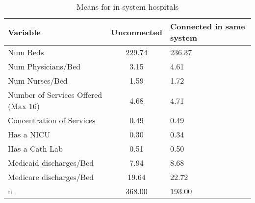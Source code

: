 \begin{table}[ht!]
\centering
\caption{Means for in-system hospitals}
\centering
\begin{tabular}[t]{lcl}
\toprule
Variable & Unconnected & Connected in same system\\
\midrule
Num Beds & 229.74 & 236.37\\
Num Physicians/Bed & 3.15 & 4.61\\
Num Nurses/Bed & 1.59 & 1.72\\
Number of Services Offered (Max 16) & 4.68 & 4.71\\
Concentration of Services & 0.49 & 0.49\\
\addlinespace
Has a NICU & 0.30 & 0.34\\
Has a Cath Lab & 0.51 & 0.50\\
Medicaid discharges/Bed & 7.94 & 8.68\\
Medicare discharges/Bed & 19.64 & 22.72\\
n & 368.00 & 193.00\\
\bottomrule
\end{tabular}
\end{table}

